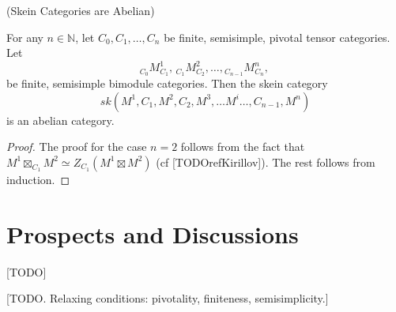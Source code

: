 \begin{corollary}\label{corollary/skein-category-is-abelian} (Skein Categories are Abelian)

  \noindent For any $n \in \mathbb{N}$, let $C_{0}, C_{1}, \ldots, C_{n}$ be
  finite, semisimple, pivotal tensor categories. Let
  \[
    {}_{C_{0}}M^{1}_{C_{1}}, \, {}_{C_{1}}M^{2}_{C_{2}}, \ldots, {}_{C_{n-1}}M^{n}_{C_{n}}, \,
  \]
  be finite, semisimple bimodule categories. Then the skein category
  \[
    sk(M^{1}, C_{1}, M^{2}, C_{2}, M^{3}, \ldots M^{i} \ldots, C_{n-1}, M^{n})
  \]
  is an abelian category.
\end{corollary}
\begin{proof}
  The proof for the case $n=2$ follows from the fact that
  $M^{1} \boxtimes_{C_{1}} M^{2} \simeq Z_{C_{1}}(M^{1} \boxtimes M^{2})$ (cf
  [TODOrefKirillov]). The rest follows from induction.
\end{proof}

\section{Prospects and Discussions}

[TODO]

[TODO. Relaxing conditions: pivotality, finiteness, semisimplicity.]
